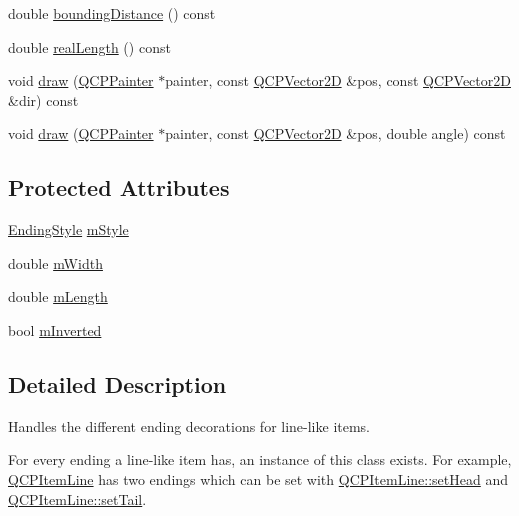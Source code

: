 \begin{DoxyCompactItemize}
\item 
double \mbox{\hyperlink{class_q_c_p_line_ending_a14fe390ddd590864ac66a60ed5278df5}{bounding\+Distance}} () const
\item 
double \mbox{\hyperlink{class_q_c_p_line_ending_acacd24d386d459b282d3c57f16a5405d}{real\+Length}} () const
\item 
void \mbox{\hyperlink{class_q_c_p_line_ending_a4f45db54f2aba03acf055e29aec1e8e7}{draw}} (\mbox{\hyperlink{class_q_c_p_painter}{Q\+C\+P\+Painter}} $\ast$painter, const \mbox{\hyperlink{class_q_c_p_vector2_d}{Q\+C\+P\+Vector2D}} \&pos, const \mbox{\hyperlink{class_q_c_p_vector2_d}{Q\+C\+P\+Vector2D}} \&dir) const
\item 
void \mbox{\hyperlink{class_q_c_p_line_ending_af7ac30a81ba85b9bded148c6ec387391}{draw}} (\mbox{\hyperlink{class_q_c_p_painter}{Q\+C\+P\+Painter}} $\ast$painter, const \mbox{\hyperlink{class_q_c_p_vector2_d}{Q\+C\+P\+Vector2D}} \&pos, double angle) const
\end{DoxyCompactItemize}
\subsection*{Protected Attributes}
\begin{DoxyCompactItemize}
\item 
\mbox{\hyperlink{class_q_c_p_line_ending_a5ef16e6876b4b74959c7261d8d4c2cd5}{Ending\+Style}} \mbox{\hyperlink{class_q_c_p_line_ending_a4696fc9117b60f1ca7690fcd2ba56611}{m\+Style}}
\item 
double \mbox{\hyperlink{class_q_c_p_line_ending_aca89d21341133c20dc6825c33a5eac48}{m\+Width}}
\item 
double \mbox{\hyperlink{class_q_c_p_line_ending_ae8e1e2566b96c05736cd92662dba8af8}{m\+Length}}
\item 
bool \mbox{\hyperlink{class_q_c_p_line_ending_a91306fe771d54c955e0af21af14349d5}{m\+Inverted}}
\end{DoxyCompactItemize}


\subsection{Detailed Description}
Handles the different ending decorations for line-\/like items. 

 For every ending a line-\/like item has, an instance of this class exists. For example, \mbox{\hyperlink{class_q_c_p_item_line}{Q\+C\+P\+Item\+Line}} has two endings which can be set with \mbox{\hyperlink{class_q_c_p_item_line_aebf3d687114d584e0459db6759e2c3c3}{Q\+C\+P\+Item\+Line\+::set\+Head}} and \mbox{\hyperlink{class_q_c_p_item_line_ac264222c3297a7efe33df9345c811a5f}{Q\+C\+P\+Item\+Line\+::set\+Tail}}.

